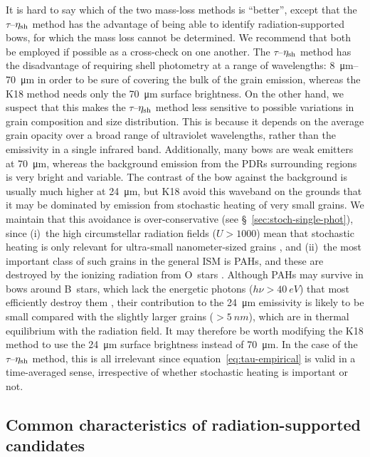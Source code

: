 It is hard to say which of the two mass-loss methods is ``better'',
except that the \(\tau\)--\(\eta_{\text{sh}}\) method has the advantage of
being able to identify radiation-supported bows, for which the mass
loss cannot be determined.  We recommend that both be employed if
possible as a cross-check on one another.  The
\(\tau\)--\(\eta_{\text{sh}}\) method has the disadvantage of requiring
shell photometry at a range of wavelengths: \SIrange{8}{70}{\um} in
order to be sure of covering the bulk of the grain emission, whereas
the K18 method needs only the \SI{70}{\um} surface brightness.  On the
other hand, we suspect that this makes the \(\tau\)--\(\eta_{\text{sh}}\)
method less sensitive to possible variations in grain composition and
size distribution.  This is because it depends on the average grain
opacity over a broad range of ultraviolet wavelengths, rather than the
emissivity in a single infrared band.  Additionally, many bows are
weak emitters at \SI{70}{\um}, whereas the background emission from
the PDRs surrounding \hii{} regions is very bright and variable.  The
contrast of the bow against the background is usually much higher at
\SI{24}{\um}, but K18 avoid this waveband on the grounds that it may
be dominated by emission from stochastic heating of very small grains.
We maintain that this avoidance is over-conservative (see
\S~\ref{sec:stoch-single-phot}), since (i)~the high circumstellar
radiation fields (\(U > 1000\)) mean that stochastic heating is only
relevant for ultra-small nanometer-sized grains \citep{Draine:2001a},
and (ii)~the most important class of such grains in the general ISM is
PAHs, and these are destroyed by the ionizing radiation from O~stars
\citep{Desert:1990a}.  Although PAHs may survive in bows around
B~stars, which lack the energetic photons (\(h\nu > \SI{40}{eV}\))
that most efficiently destroy them \citep{Lebouteiller:2007a}, their
contribution to the \SI{24}{\um} emissivity is likely to be small
compared with the slightly larger grains (\(> \SI{5}{nm}\)), which are
in thermal equilibrium with the radiation field.  It may therefore be
worth modifying the K18 method to use the \SI{24}{\um} surface
brightness instead of \SI{70}{\um}.  In the case of the
\(\tau\)--\(\eta_{\text{sh}}\) method, this is all irrelevant since
equation~\eqref{eq:tau-empirical} is valid in a time-averaged sense,
irrespective of whether stochastic heating is important or not.


\subsection{Common characteristics of radiation-supported candidates}
\label{sec:comm-prop-cand}


